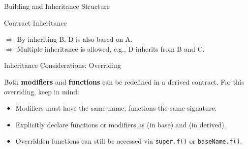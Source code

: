 \documentclass[]{beamer}
\begin{document}
\begin{frame}{Building and Inheritance Structure}

\vspace{0.5em}	
\begin{minipage}{0.48\textwidth}
	\begin{samplecode}{Contract Inheritance}
		
	\end{samplecode}
\end{minipage}	
\begin{minipage}{0.48\textwidth}
	\begin{figure}[t]
		\centering
		\begin{tikzpicture}[scale=1.0, every node/.style={scale=1.0}]
			
		\end{tikzpicture}
	\end{figure}
\end{minipage}	

\vspace{2.0em}

$\Rightarrow$ By inheriting B, D is also based on A.\\

\vspace{1.0em}
$\Rightarrow$ Multiple inheritance is allowed, e.g., D inherits from B and C.\\


\end{frame}


\begin{frame}{Inheritance Considerations: Overriding}

Both \textbf{modifiers} and \textbf{functions} can be redefined in a derived contract. For this overriding, keep in mind:
\vspace{0.5em}
\begin{itemize}
	\item<2-> Modifiers must have the same name, functions the same signature.
	\item<3-> Explicitly declare functions or modifiers as  (in base) and  (in derived).
	\item<4->  Overridden functions can still be accessed via \texttt{super.f()} or \texttt{baseName.f()}.	
\end{itemize}

\vspace{1.5em}


\end{frame}
\end{document}
